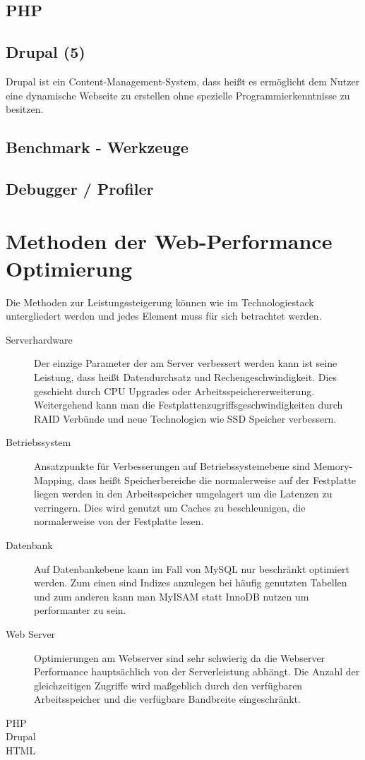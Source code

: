\subsection{PHP}
\subsection{Drupal (5)}
Drupal ist ein Content-Management-System, dass heißt es ermöglicht dem Nutzer eine dynamische Webseite zu erstellen ohne spezielle Programmierkenntnisse zu besitzen. 

\subsection{Benchmark - Werkzeuge}
\subsection{Debugger / Profiler}
\section{Methoden der Web-Performance Optimierung}
Die Methoden zur Leistungssteigerung können wie im Technologiestack untergliedert werden und jedes Element muss für sich betrachtet werden.

\begin{description}
  \item[Serverhardware] Der einzige Parameter der am Server verbessert werden kann ist seine Leistung, dass heißt Datendurchsatz und Rechengeschwindigkeit. Dies geschieht durch CPU Upgrades oder Arbeitsspeichererweiterung. Weitergehend kann man die Festplattenzugriffsgeschwindigkeiten durch RAID Verbünde und neue Technologien wie SSD Speicher verbessern. 
  \item[Betriebssystem] Ansatzpunkte für Verbesserungen auf Betriebssystemebene sind Memory-Mapping, dass heißt Speicherbereiche die normalerweise auf der Festplatte liegen werden in den Arbeitsspeicher umgelagert um die Latenzen zu verringern. Dies wird genutzt um Caches zu beschleunigen, die normalerweise von der Festplatte lesen.
  \item[Datenbank] Auf Datenbankebene kann im Fall von MySQL nur beschränkt optimiert werden. Zum einen sind Indizes anzulegen bei häufig genutzten Tabellen und zum anderen kann man MyISAM statt InnoDB nutzen um performanter zu sein.
  \item[Web Server] Optimierungen am Webserver sind sehr schwierig da die Webserver Performance hauptsächlich von der Serverleistung abhängt. Die Anzahl der gleichzeitigen Zugriffe wird maßgeblich durch den verfügbaren Arbeitsspeicher und die verfügbare Bandbreite eingeschränkt.
  \item[PHP] 
  \item[Drupal] 
  \item[HTML] 
\end{description}